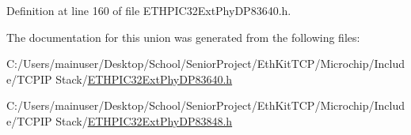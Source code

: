Definition at line 160 of file E\+T\+H\+P\+I\+C32\+Ext\+Phy\+D\+P83640.\+h.



The documentation for this union was generated from the following files\+:\begin{DoxyCompactItemize}
\item 
C\+:/\+Users/mainuser/\+Desktop/\+School/\+Senior\+Project/\+Eth\+Kit\+T\+C\+P/\+Microchip/\+Include/\+T\+C\+P\+I\+P Stack/\hyperlink{_e_t_h_p_i_c32_ext_phy_d_p83640_8h}{E\+T\+H\+P\+I\+C32\+Ext\+Phy\+D\+P83640.\+h}\item 
C\+:/\+Users/mainuser/\+Desktop/\+School/\+Senior\+Project/\+Eth\+Kit\+T\+C\+P/\+Microchip/\+Include/\+T\+C\+P\+I\+P Stack/\hyperlink{_e_t_h_p_i_c32_ext_phy_d_p83848_8h}{E\+T\+H\+P\+I\+C32\+Ext\+Phy\+D\+P83848.\+h}\end{DoxyCompactItemize}
